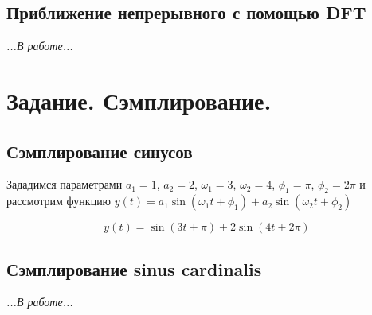 \documentclass[a5paper, 10pt]{article}
\theoremstyle{definition}
\theoremstyle{plain}
\theoremstyle{remark}
\begin{document}
\subsection{Приближение непрерывного с помощью DFT}
\textit{...В работе...}








\newpage
\section{Задание. Сэмплирование.}

\subsection{Сэмплирование синусов}
Зададимся параметрами $a_1=1$, $a_2=2$, $\omega_1 = 3$, $\omega_2 = 4$, $\phi_1 = \pi$, $\phi_2 = 2\pi$ и рассмотрим функцию $y(t) = a_1 \sin \left( \omega_1 t + \phi_1 \right) + a_2 \sin \left(  \omega_2 t + \phi_2 \right)$

\begin{equation}
y(t) =  \sin \left( 3 t + \pi \right) + 2 \sin \left(  4 t + 2\pi \right)
\end{equation}




\subsection{Сэмплирование sinus cardinalis}
\textit{...В работе...}
\end{document}
